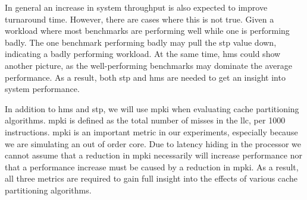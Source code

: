 In general an increase in system throughput is also expected to improve turnaround time.
However, there are cases where this is not true.
Given a workload where most benchmarks are performing well while one is performing badly.
The one benchmark performing badly may pull the \gls{stp} value down, indicating a badly performing workload.
At the same time, \gls{hms} could show another picture, as the well-performing benchmarks may dominate the average performance.
As a result, both \gls{stp} and \gls{hms} are needed to get an insight into system performance.

In addition to \gls{hms} and \gls{stp}, we will use \gls{mpki} when evaluating cache partitioning algorithms.
\gls{mpki} is defined as the total number of misses in the \gls{llc}, per 1000 instructions.
\gls{mpki} is an important metric in our experiments, especially because we are simulating an out of order core. 
Due to latency hiding in the processor we cannot assume that a reduction in \gls{mpki} necessarily will increase performance nor that a performance increase must be caused by a reduction in \gls{mpki}.
As a result, all three metrics are required to gain full insight into the effects of various cache partitioning algorithms.